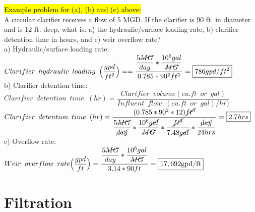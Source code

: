 \documentclass{article}
\begin{document}
\begin{itemize}
\hl{Example problem for (a), (b) and (c) above:}\\
		\vspace{0.2cm}
A circular clarifier receives a flow of 5 MGD.  If the clarifier is 90 ft. in diameter and is 12 ft. deep, what is: a) the hydraulic/surface loading rate, b) clarifier detention time in hours, and c) weir overflow rate?\\
		\vspace{0.2cm}
a) Hydraulic/surface loading rate:\\
$Clarifier \enspace hydraulic \enspace loading \enspace 	\Big(\dfrac{gpd}{ft^2}\Big) ==\dfrac{\dfrac{5\cancel{MG}}{{day}}*\dfrac{10^6gal}{\cancel{MG}}}{0.785*90^2 ft^2}=\boxed{786gpd/ft^2}$\\
		\vspace{0.5cm}
b) Clarifier detention time:\\
$Clarifier \enspace detention \enspace time \enspace (hr) = 	\dfrac{ Clarifier \enspace volume (cu.ft \enspace or \enspace gal)}{Influent \enspace flow \enspace (cu.ft \enspace or \enspace gal)/hr)}$\\
		\vspace{0.2cm}
$Clarifier \enspace detention \enspace time \enspace (hr) = 	\dfrac{(0.785*90^2*12)\cancel{ft^3}}{\dfrac{5\cancel{MG}}{\cancel{day}}*\dfrac{10^6\cancel{gal}}{\cancel{MG}}*\dfrac{\cancel{ft^3}}{7.48\cancel{gal}}*\dfrac{\cancel{day}}{24hrs}}=\boxed{2.7hrs}$\\
		\vspace{0.5cm}
c) Overflow rate:\\
		\vspace{0.2cm} 
$Weir \enspace overflow \enspace rate \Big(\dfrac{gpd}{ft}\Big) =\dfrac{\dfrac{5\cancel{MG}}{{day}}*\dfrac{10^6gal}{\cancel{MG}}}{3.14*90 ft}=\boxed{17,692 \mathrm{gpd}/\mathrm{ft}}$\\
\end{itemize}

\section{Filtration}
\end{document}
